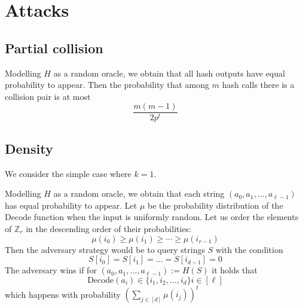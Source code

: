 \documentclass{article}
\begin{document}

\section{Attacks}

\subsection{Partial collision}

Modelling $H$ as a random oracle, we obtain that all  hash outputs  have equal probability to appear. Then the probability that among $m$ hash calls there is a collision pair is at most
$$
\frac{m(m-1)}{2p^{t}}
$$



\subsection{Density}

We consider the simple case where $k=1$.

Modelling $H$ as a random oracle, we obtain that each string $(a_0,a_1,\ldots,a_{\ell-1})$ has equal probability to appear. Let $\mu$ be the probability distribution of the $\mathrm{Decode}$  function when the input is uniformly random. Let us order the elements of $\mathbb{Z}_r$ in the descending order of their probabilities:
$$
\mu(i_0)\geq \mu(i_1)\geq \cdots \geq \mu(i_{r-1})
$$
Then the adversary strategy would be to query strings $S$ with the condition
$$
S[i_0]=S[i_1]=\ldots=S[i_{d-1}]=0
$$
The adversary wins if for $(a_0,a_1,\ldots,a_{\ell-1}) :=H(S)$ it holds that
$$
\mathrm{Decode}(a_i)\in\{i_1,i_2,\ldots,i_d\} i\in[\ell]
$$
which happens with probability $\left(\sum_{j\in[d]}\mu(i_j)\right)^{\ell}$
\end{document}
